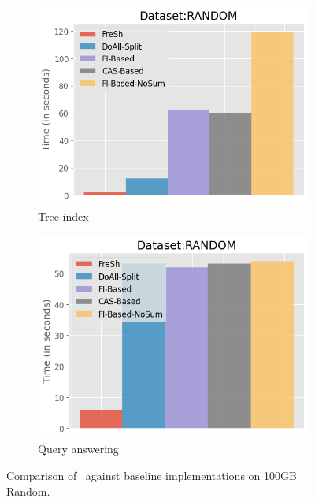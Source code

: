 \begin{figure}[htbp]
    \begin{subfigure}{0.48\textwidth}  
        \includegraphics[width=\textwidth]{figures/Experiments/baselines-random-tree.png}
        \caption{Tree index}
        \label{fig:eval:baselines:random:100GB:tree-index}
    \end{subfigure}    
    \begin{subfigure}{0.48\textwidth}  
        \includegraphics[width=\textwidth]{figures/Experiments/baselines-random-query.png}
        \caption{Query answering}
        \label{fig:eval:baselines:random:100GB:query-answering}
    \end{subfigure}    

    \caption{Comparison of \Fresh\ against baseline implementations on 100GB Random.}
    \label{fig:eval:baselines:random:100GB}
\end{figure}


